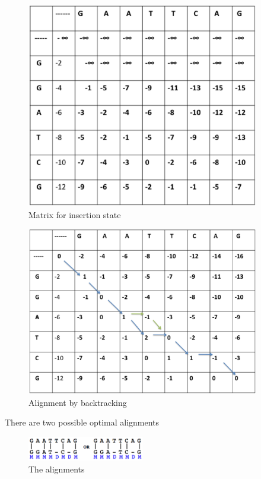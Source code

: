 \documentclass[english, a4paper,11pt]{article}
\begin{document}
\begin{figure}
\begin{centering}
\caption{Matrix for insertion state}
\includegraphics[width=4in]{Slide3}
\par\end{centering}
\end{figure}

\begin{figure}
\begin{centering}
\includegraphics[width=4in]{Slide4}\caption{Alignment by backtracking}
\par\end{centering}
\end{figure}

There are two possible optimal alignments

\begin{figure}
\begin{centering}
\includegraphics[width=2in]{alignment2}
\par\end{centering}
\caption{The alignments}
\end{figure}
\end{document}
